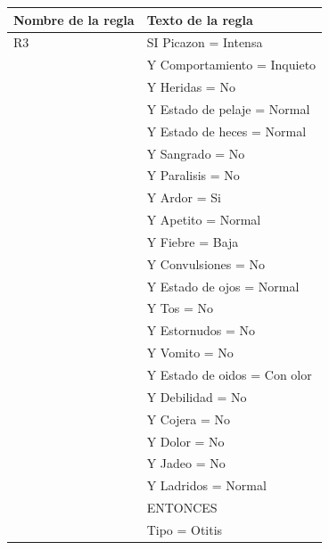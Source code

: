 \documentclass[a4paper,table,xcdraw]{article}
\begin{document}
\begin{table}[H]
\centering
\begin{tabular}{|l|l|}
\hline
\textbf{Nombre de la regla} & Texto de la regla \\ \hline
R3 & SI Picazon = Intensa \\
  & Y Comportamiento = Inquieto \\
  & Y Heridas = No \\
  & Y Estado de pelaje = Normal \\
  & Y Estado de heces = Normal \\
  & Y Sangrado = No \\
  & Y Paralisis = No \\
  & Y Ardor = Si \\
  & Y Apetito = Normal \\
  & Y Fiebre = Baja \\
  & Y Convulsiones = No \\
  & Y Estado de ojos = Normal \\
  & Y Tos = No \\
  & Y Estornudos = No \\
  & Y Vomito = No \\
  & Y Estado de oidos = Con olor \\
  & Y Debilidad = No \\
  & Y Cojera = No \\
  & Y Dolor = No \\
  & Y Jadeo = No \\
  & Y Ladridos = Normal \\
  &   ENTONCES \\
  & Tipo = Otitis \\ \hline
\end{tabular}
\end{table}
  
\end{document}
